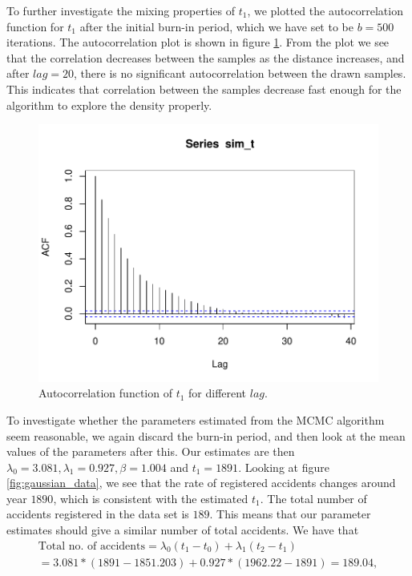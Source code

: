 To further investigate the mixing properties of $t_1$, we plotted the autocorrelation function for $t_1$ after the initial burn-in period, which we have set to be $b = 500$ iterations. The autocorrelation plot is shown in figure \ref{fig:acf_t}. From the plot we see that the correlation decreases between the samples as the distance increases, and after $lag = 20$, there is no significant autocorrelation between the drawn samples. This indicates that correlation between the samples decrease fast enough for the algorithm to explore the density properly. 

\begin{figure}[H]
    \centering
    \includegraphics[width = \textwidth]{Images/acf_t_10000.pdf}
    \caption{Autocorrelation function of $t_1$ for different $lag$. }
    \label{fig:acf_t}
\end{figure}

To investigate whether the parameters estimated from the MCMC algorithm seem reasonable, we again discard the burn-in period, and then look at the mean values of the parameters after this. Our estimates are then $\lambda_0 = 3.081, \lambda_1 = 0.927 , \beta = 1.004 $ and $t_1 = 1891$. Looking at figure \ref{fig:gaussian_data}, we see that the rate of registered accidents changes around year $1890$, which is consistent with the estimated $t_1$. The total number of accidents registered in the data set is $189$. This means that our parameter estimates should give a similar number of total accidents. We have that
\begin{align}
    \text{Total no. of accidents} = \lambda_0(t_1 - t_0) + \lambda_1(t_2 - t_1) \nonumber \\
    = 3.081*(1891-1851.203) + 0.927*(1962.22 - 1891) = 189.04, 
\end{align}

